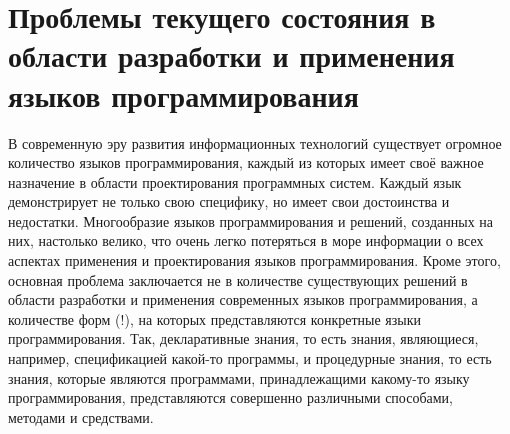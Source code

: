\section{Проблемы текущего состояния в области разработки и применения языков программирования}
\label{sec_programs_problems_and_tasks}

В современную эру развития информационных технологий существует огромное количество языков программирования, каждый из которых имеет своё важное назначение в области проектирования программных систем. Каждый язык демонстрирует не только свою специфику, но имеет свои достоинства и недостатки. Многообразие языков программирования \cite{Sebesta2012} и решений, созданных на них, настолько велико, что очень легко потеряться в море информации о всех аспектах применения и проектирования языков программирования. Кроме этого, основная проблема заключается не в количестве существующих решений в области разработки и применения современных языков программирования, а количестве форм (!), на которых представляются конкретные языки программирования. Так, декларативные знания, то есть знания, являющиеся, например, спецификацией какой-то программы, и процедурные знания, то есть знания, которые являются программами, принадлежащими какому-то языку программирования, представляются совершенно различными способами, методами и средствами.

